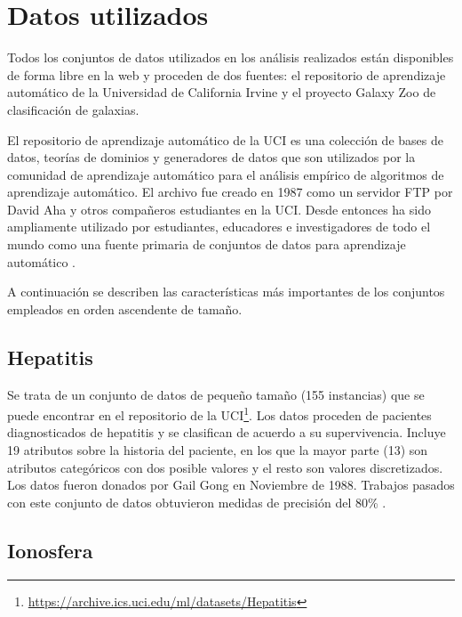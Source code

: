 \section{Datos utilizados}

Todos los conjuntos de datos utilizados en los análisis realizados están disponibles de forma libre en la web y proceden de dos fuentes: el repositorio de aprendizaje automático de la Universidad de California Irvine y el proyecto Galaxy Zoo de clasificación de galaxias.

El repositorio de aprendizaje automático de la UCI es una colección de bases de datos, teorías de dominios y generadores de datos que son utilizados por la comunidad de aprendizaje automático para el análisis empírico de algoritmos de aprendizaje automático. El archivo fue creado en 1987 como un servidor FTP por David Aha y otros compañeros estudiantes en la UCI. Desde entonces ha sido ampliamente utilizado por estudiantes, educadores e investigadores de todo el mundo como una fuente primaria de conjuntos de datos para aprendizaje automático \cite{ml-uci}.

A continuación se describen las características más importantes de los conjuntos empleados en orden ascendente de tamaño.

\subsection{Hepatitis}

Se trata de un conjunto de datos de pequeño tamaño (155 instancias) que se puede encontrar en el repositorio de la UCI\footnote{\url{https://archive.ics.uci.edu/ml/datasets/Hepatitis}}. Los datos proceden de pacientes diagnosticados de hepatitis y se clasifican de acuerdo a su supervivencia. Incluye 19 atributos sobre la historia del paciente, en los que la mayor parte (13) son atributos categóricos con dos posible valores y el resto son valores discretizados. Los datos fueron donados por Gail Gong en Noviembre de 1988. Trabajos pasados con este conjunto de datos obtuvieron medidas de precisión del 80\% \cite{hepatitis-gong}.

\subsection{Ionosfera}

